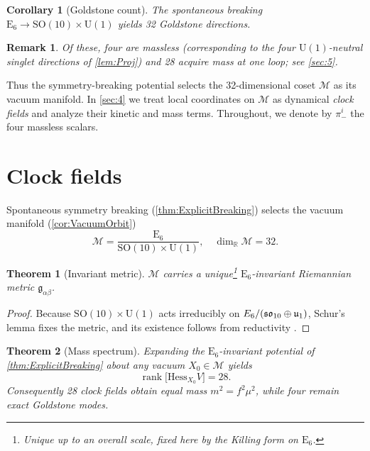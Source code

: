 \documentclass[pdflatex,sn-mathphys-num]{sn-jnl}
\theoremstyle{thmstyleone}
\newtheorem{theorem}{Theorem}
\newtheorem{corollary}[corollary]{Corollary}
\theoremstyle{thmstyletwo}%
\newtheorem{remark}{Remark}%
\theoremstyle{thmstylethree}%
\newcommand{\SO}[1]{\mathrm{SO(#1)}}
\newcommand{\U}[1]{\mathrm{U(#1)}}
\newcommand{\E}[1]{\mathrm{E_{#1}}}
\newcommand{\SOTen}{\SO{10}}
\newcommand{\UOne}{\U{1}}
\newcommand{\ESix}{\E{6}}
\begin{document}
\begin{corollary}[Goldstone count]\label{cor:GoldstoneCount}
The spontaneous breaking \(\ESix\to \SOTen\times \UOne\) yields
32 Goldstone directions. 
\end{corollary}

\begin{remark}
    Of these, four are massless (corresponding to the four $\UOne$-neutral singlet directions of \autoref{lem:Proj})
    and 28 acquire mass at one loop; see \autoref{sec:5}.
\end{remark}

Thus the symmetry-breaking potential selects the
32-dimensional coset \(\mathcal M\) as its vacuum manifold.  In
\autoref{sec:4} we treat local coordinates on \(\mathcal M\) as
dynamical \emph{clock fields} and analyze their kinetic and mass terms. Throughout, we denote by $\pi_-^{i}$ the four massless scalars.

\section{Clock fields}
\label{sec:4}

Spontaneous symmetry breaking (\autoref{thm:ExplicitBreaking}) selects the vacuum manifold (\autoref{cor:VacuumOrbit})
\[
  \mathcal M = \frac{\ESix}{\SOTen\times \UOne},
  \quad \dim_{\mathbb R}\mathcal M=32 .
\]

\begin{theorem}[Invariant metric]\label{thm:InvariantMetric}
$\mathcal M$ carries a unique\footnote{%
  Unique up to an overall scale, fixed here by the Killing form on $\ESix$.}
$\ESix$-invariant Riemannian metric
$\mathfrak g_{\alpha\beta}$.
\end{theorem}

\begin{proof}
Because $\SOTen\times \UOne$ acts irreducibly on
$\mathfrak \ESix/(\mathfrak{so}_{10}\oplus\mathfrak u_{1})$, Schur’s
lemma fixes the metric, and its existence follows from reductivity
\cite{Helgason:1978}.
\end{proof}

\begin{theorem}[Mass spectrum]\label{thm:MassSpectrum}
Expanding the $\ESix$-invariant potential of
\autoref{thm:ExplicitBreaking} about any vacuum
$X_{0}\in\mathcal M$ yields
\[
  \operatorname{rank}\bigl[\mathrm{Hess}_{X_{0}}V\bigr]=28 .
\]
Consequently 28 clock fields obtain equal mass
$m^{2}=f^{2}\mu^{2}$, while four remain exact Goldstone modes.
\end{theorem}
\end{document}
